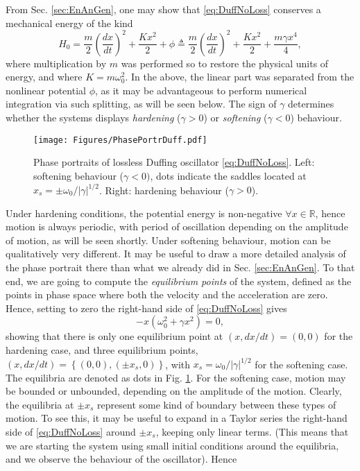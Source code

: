 \documentclass[11pt,twoside,a4paper,english]{book}
\begin{document}
 
From Sec. \ref{sec:EnAnGen}, one may show that \eqref{eq:DuffNoLoss} conserves a mechanical energy of the kind
\begin{equation}\label{eq:EnContDuffNoLoss}
    H_0 = \frac{m}{2}\left(\frac{dx}{dt} \right)^2 +  \frac{K x^2}{2} + \phi \triangleq \frac{m}{2}\left(\frac{dx}{dt} \right)^2 + \frac{K x^2}{2} + \frac{m\gamma x^4}{4},
\end{equation}
where multiplication by $m$ was performed so to restore the physical units of energy, and where $K = m\omega_0^2$. In the above, the linear part was separated from the nonlinear potential $\phi$, as it may be advantageous to perform numerical integration via such splitting, as will be seen below. The sign of $\gamma$ determines whether the systems displays \emph{hardening} ($\gamma > 0$) or \emph{softening} ($\gamma < 0$) behaviour. 
\begin{figure}
    \texttt{[image: Figures/PhasePortrDuff.pdf]}
    \caption{Phase portraits of lossless Duffing oscillator \eqref{eq:DuffNoLoss}. Left: softening behaviour ($\gamma <0)$, dots indicate the saddles located at $x_s = \pm \omega_0/|\gamma|^{1/2}$. Right: hardening behaviour ($\gamma > 0$).}\label{fig:PhasePortDuff}
\end{figure}
Under hardening conditions, the potential energy is non-negative $\forall x \in \mathbb{R}$, hence motion is always periodic, with period of oscillation depending on the amplitude of motion, as will be seen shortly. Under softening behaviour, motion can be qualitatively very different. It may be useful to draw a more detailed analysis of the phase portrait there than what we already did in Sec. \ref{sec:EnAnGen}. To that end, we are going to compute the \emph{equilibrium points} of the system, defined as the points in phase space where both the velocity and the acceleration are zero. Hence, setting to zero the right-hand side of \eqref{eq:DuffNoLoss} gives
\begin{equation}
    -x\left(\omega_0^2 + \gamma x^2\right) = 0,
\end{equation}
showing that there is only one equilibrium point at $(x,dx/dt)=(0,0)$ for the hardening case, and three equilibrium points, $(x,dx/dt) = \left\{(0,0), (\pm x_s,0)\right\}$, with $x_s = \omega_0/|\gamma|^{1/2}$ for the softening case. The equilibria are denoted as dots in Fig. \ref{fig:PhasePortDuff}. For the softening case, motion may be bounded or unbounded, depending on the amplitude of the motion. Clearly, the equilibria at $\pm x_s$ represent some kind of boundary between these types of motion. To see this, it may be useful to expand in a Taylor series the right-hand side of  \eqref{eq:DuffNoLoss} around $\pm x_s$, keeping only linear terms. (This means that we are starting the system using small initial conditions around the equilibria, and we observe the behaviour of the oscillator). Hence
\end{document}
